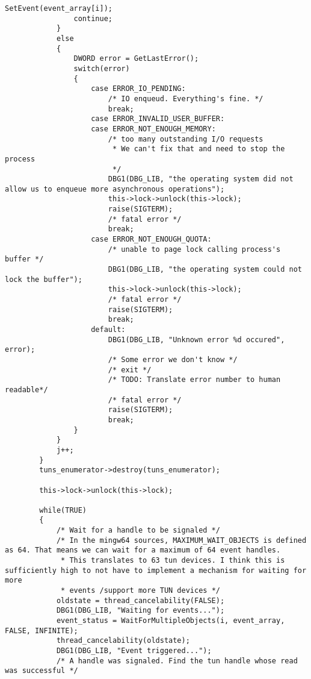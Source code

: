 \begin{lstlisting}[caption=Code für handle\_plain auf Windows]
                SetEvent(event_array[i]);
                continue;
            }
            else
            {
                DWORD error = GetLastError();
                switch(error)
                {
                    case ERROR_IO_PENDING:
                        /* IO enqueud. Everything's fine. */
                        break;
                    case ERROR_INVALID_USER_BUFFER:
                    case ERROR_NOT_ENOUGH_MEMORY:
                        /* too many outstanding I/O requests
                         * We can't fix that and need to stop the process
                         */
                        DBG1(DBG_LIB, "the operating system did not allow us to enqueue more asynchronous operations");
                        this->lock->unlock(this->lock);
                        raise(SIGTERM);
                        /* fatal error */
                        break;
                    case ERROR_NOT_ENOUGH_QUOTA:
                        /* unable to page lock calling process's buffer */
                        DBG1(DBG_LIB, "the operating system could not lock the buffer");
                        this->lock->unlock(this->lock);
                        /* fatal error */
                        raise(SIGTERM);
                        break;
                    default:
                        DBG1(DBG_LIB, "Unknown error %d occured", error);
                        /* Some error we don't know */
                        /* exit */
                        /* TODO: Translate error number to human readable*/
                        /* fatal error */
                        raise(SIGTERM);
                        break;
                }
            }
            j++;
        }
        tuns_enumerator->destroy(tuns_enumerator);

        this->lock->unlock(this->lock);

        while(TRUE)
        {
            /* Wait for a handle to be signaled */
            /* In the mingw64 sources, MAXIMUM_WAIT_OBJECTS is defined as 64. That means we can wait for a maximum of 64 event handles.
             * This translates to 63 tun devices. I think this is sufficiently high to not have to implement a mechanism for waiting for more
             * events /support more TUN devices */
            oldstate = thread_cancelability(FALSE);
            DBG1(DBG_LIB, "Waiting for events...");
            event_status = WaitForMultipleObjects(i, event_array, FALSE, INFINITE);
            thread_cancelability(oldstate);
            DBG1(DBG_LIB, "Event triggered...");
            /* A handle was signaled. Find the tun handle whose read was successful */


\end{lstlisting}
